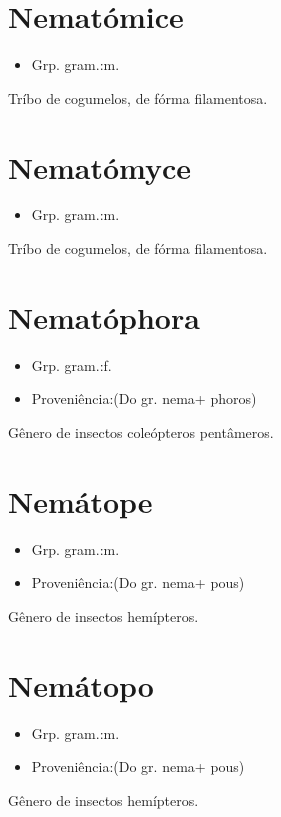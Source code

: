 \section{Nematómice}
\begin{itemize}
\item {Grp. gram.:m.}
\end{itemize}
Tríbo de cogumelos, de fórma filamentosa.
\section{Nematómyce}
\begin{itemize}
\item {Grp. gram.:m.}
\end{itemize}
Tríbo de cogumelos, de fórma filamentosa.
\section{Nematóphora}
\begin{itemize}
\item {Grp. gram.:f.}
\end{itemize}
\begin{itemize}
\item {Proveniência:(Do gr. \textunderscore nema\textunderscore  + \textunderscore phoros\textunderscore )}
\end{itemize}
Gênero de insectos coleópteros pentâmeros.
\section{Nemátope}
\begin{itemize}
\item {Grp. gram.:m.}
\end{itemize}
\begin{itemize}
\item {Proveniência:(Do gr. \textunderscore nema\textunderscore  + \textunderscore pous\textunderscore )}
\end{itemize}
Gênero de insectos hemípteros.
\section{Nemátopo}
\begin{itemize}
\item {Grp. gram.:m.}
\end{itemize}
\begin{itemize}
\item {Proveniência:(Do gr. \textunderscore nema\textunderscore  + \textunderscore pous\textunderscore )}
\end{itemize}
Gênero de insectos hemípteros.
